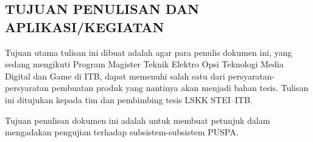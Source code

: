 \subsection*{\textcolor{subsectioncolor}{\textsf{TUJUAN PENULISAN DAN APLIKASI\slash KEGIATAN}}}

Tujuan utama tulisan ini dibuat adalah agar para penulis dokumen ini, yang sedang mengikuti Program Magister Teknik Elektro Opsi Teknologi Media Digital dan Game di ITB, dapat memenuhi salah satu dari persyaratan-persyaratan pembuatan produk yang nantinya akan menjadi bahan tesis.
Tulisan ini ditujukan kepada tim dan pembimbing tesis LSKK STEI--ITB.

Tujuan penulisan dokumen ini adalah untuk membuat petunjuk dalam mengadakan pengujian terhadap subsistem-subsistem PUSPA.
